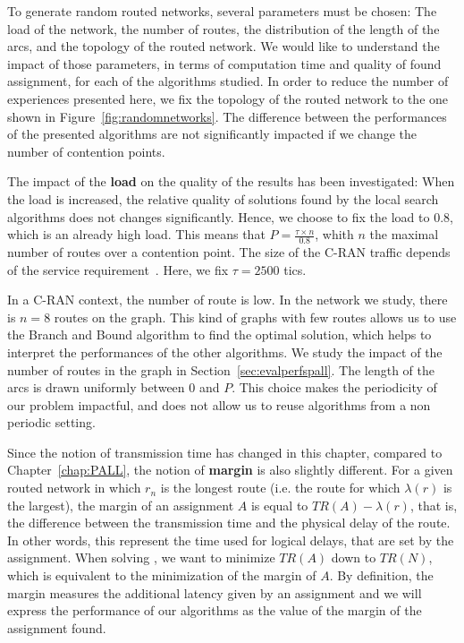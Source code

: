 To generate random routed networks, several parameters must be chosen: The load of the network, the number of routes, the distribution of the length of the arcs, and the topology of the routed network. We would like to understand the impact of those parameters, in terms of computation time and quality of found assignment, for each of the algorithms studied. In order to reduce the number of experiences presented here, we fix the topology of the routed network to the one shown in Figure~\ref{fig:randomnetworks}. The difference between the performances of the presented algorithms are not significantly impacted if we change the number of contention points. 

 
 The impact of the \textbf{load} on the quality of the results has been investigated: When the load is increased, the relative quality of solutions found by the local search algorithms does not changes significantly. Hence, we choose to fix the load to $0.8$, which is an already high load. This means that $P = \frac{\tau \times n}{0.8}$, whith $n$ the maximal number of routes over a contention point. The size of the C-RAN traffic depends of the service requirement~\cite{mobile2011c}. Here, we fix $\tau = 2500$ tics.
  
In a C-RAN context, the number of route is low. In the network we study, there is $n=8$ routes on the graph. This kind of graphs with few routes allows us to use the Branch and Bound algorithm to find the optimal solution, which helps to interpret the performances of the other algorithms. We study the impact of the number of routes in the graph in Section~\ref{sec:evalperfspall}. The length of the arcs is drawn uniformly between $0$ and $P$. This choice makes the periodicity of our problem impactful, and does not allow us to reuse algorithms from a non periodic setting.

Since the notion of transmission time has changed in this chapter, compared to Chapter~\ref{chap:PALL},
 the notion of \textbf{margin} is also slightly different. For a given routed network in which $r_n$ is the longest route (i.e. the route for which $\lambda(r)$ is the largest), the margin of an assignment $A$ is equal to $TR(A) - \lambda(r)$, that is, the difference between the transmission time and the physical delay of the route. In other words, this represent the time used for logical delays, that are set by the assignment.
 When solving \minstra, we want to minimize $TR(A)$ down to $TR(N)$, which is equivalent to the minimization of the margin of $A$. By definition, the margin measures the additional latency given by an assignment and we will express the performance of our algorithms as the value of the margin of the assignment found. 


